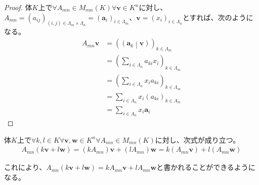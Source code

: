 \documentclass[dvipdfmx]{jsarticle}
\begin{document}
\begin{proof}
体$K$上で$\forall A_{mn} \in M_{mn}(K)\forall\mathbf{v} \in K^{n}$に対し、$A_{mn} = \left( a_{ij} \right)_{(i,j) \in \varLambda_{m} \times \varLambda_{n}} = \left( \mathbf{a}_{i} \right)_{i \in \varLambda_{m}}$、$\mathbf{v} = \left( x_{i} \right)_{i \in \varLambda_{n}}$とすれば、次のようになる。
\begin{align*}
A_{mn}\mathbf{v} &= \left( \left( \mathbf{a}_{k} \middle| \mathbf{v} \right) \right)_{k \in \varLambda_{m}}\\
&= \left( \sum_{i \in \varLambda_{n}} {a_{ki}x_{i}} \right)_{k \in \varLambda_{m}}\\
&= \left( \sum_{i \in \varLambda_{n}} {x_{i}a_{ki}} \right)_{k \in \varLambda_{m}}\\
&= \sum_{i \in \varLambda_{n}} {x_{i}\left( a_{ki} \right)_{k \in \varLambda_{m}}}\\
&= \sum_{i \in \varLambda_{n}} {x_{i}\mathbf{a}_{i}}
\end{align*}
\end{proof}
\begin{thm}\label{2.1.4.6}
体$K$上で$\forall k,l \in K\forall\mathbf{v},\mathbf{w} \in K^{n}\forall A_{mn} \in M_{mn}(K)$に対し、次式が成り立つ。
\begin{align*}
A_{mn}\left( k\mathbf{v} + l\mathbf{w} \right) = \left( kA_{mn} \right)\mathbf{v} + \left( lA_{mn} \right)\mathbf{w} = k\left( A_{mn}\mathbf{v} \right) + l\left( A_{mn}\mathbf{w} \right)
\end{align*}
\end{thm}\par
これにより、$A_{mn}\left( k\mathbf{v} + l\mathbf{w} \right) = kA_{mn}\mathbf{v} + lA_{mn}\mathbf{w}$と書かれることができるようになる。
\end{document}
